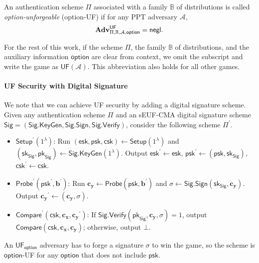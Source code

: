 An authentication scheme $\Pi$ associated with a family $\mathbb{B}$ of distributions is called \emph{\textsf{option}-unforgeable} (\textsf{option}-UF) if for any PPT adversary $\mathcal{A}$,
\[
	\mathbf{Adv}^{\textsf{UF}}_{\Pi, \mathbb{B}, \mathcal{A}, \textsf{option}} = \mathsf{negl}.
\]

For the rest of this work, if the scheme $\Pi$, the family $\mathbb{B}$ of distributions, and the auxiliary information $\textsf{option}$ are clear from context, we omit the subscript and write the game as $\textsf{UF}(\mathcal{A})$. This abbreviation also holds for all other games.


\paragraph{UF Security with Digital Signature}

We note that we can achieve UF security by adding a digital signature scheme. Given any authentication scheme $\Pi$ and an sEUF-CMA digital signature scheme $\textsf{Sig} = (\textsf{Sig.KeyGen}, \textsf{Sig.Sign}, \textsf{Sig.Verify})$, consider the following scheme $\Pi^\prime$.

\begin{itemize}

	\item $\textsf{Setup}^\prime (1^\lambda)$: Run $(\textsf{esk}, \textsf{psk}, \textsf{csk}) \gets \textsf{Setup}(1^\lambda)$ and $(\textsf{sk}_{\textsf{Sig}}, \textsf{pk}_{\textsf{Sig}}) \gets \textsf{Sig.KeyGen}(1^\lambda)$. Output $\textsf{esk}^\prime \gets \textsf{esk}$, $\textsf{psk}^\prime \gets (\textsf{psk}, \textsf{sk}_{\textsf{Sig}})$, $\textsf{csk}^\prime \gets \textsf{csk}$.

	\item $\textsf{Probe}^\prime (\textsf{psk}^\prime, \mathbf{b}^\prime)$: Run $\mathbf{c_y} \gets \textsf{Probe}(\textsf{psk}, \mathbf{b}^\prime)$ and $\sigma \gets \textsf{Sig.Sign}(\textsf{sk}_{\textsf{Sig}}, \mathbf{c_y})$. Output $\mathbf{c_y}^\prime \gets (\mathbf{c_y}, \sigma)$.

	\item $\textsf{Compare}^\prime (\textsf{csk}, \mathbf{c_x}, \mathbf{c_y}^\prime)$: If $\textsf{Sig.Verify}(\textsf{pk}_{\textsf{Sig}}, \mathbf{c_y}, \sigma) = 1$, output $\textsf{Compare}(\textsf{csk}, \mathbf{c_x}, \mathbf{c_y})$; otherwise, output $\bot$.

\end{itemize}

An $\textsf{UF}_\textsf{option}$ adversary has to forge a signature $\sigma$ to win the game, so the scheme is $\textsf{option}$-UF for any $\textsf{option}$ that does not include $\textsf{psk}$. 


